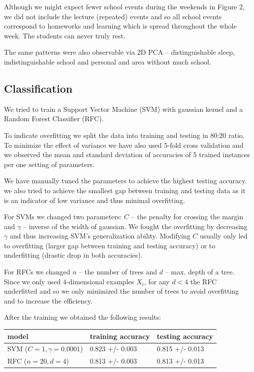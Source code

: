 \documentclass[a4paper, 12pt]{article}
\begin{document}
Although we might expect fewer school events during the weekends in Figure 2,
we did not include the lecture (repeated) events and so all school events correspond to
homeworks and learning which is spread throughout the whole week.
The students can never truly rest.

The same patterns were also observable via 2D PCA -- distinguishable sleep,
indistinguishable school and personal and area without much school.

\subsection{Classification}
We tried to train a Support Vector Machine (SVM) with gaussian kernel and 
a Random Forest Classifier (RFC). 

\medskip

To indicate overfitting we split the data into training and testing in 80:20
ratio. To minimize the effect of variance we have also used 5-fold 
cross validation and we observed the mean and standard deviation of accuracies
of 5 trained instances per one setting of parameters.

We have manually tuned the parameters to achieve the highest testing accuracy.
we also tried to achieve the smallest gap between training and testing
data as it is an indicator of low variance and thus minimal overfitting.

For SVMs we changed two parameters: $C$ -- the penalty for crossing the
margin and $\gamma$ -- inverse of the width of gaussian. We fought the
overfitting by decreasing $\gamma$ and thus increasing SVM's 
generalization ability. Modifying $C$ usually only led to overfitting (larger
gap between training and testing accuracy) or to underfitting (drastic drop
in both accuracies).

For RFCs we changed $n$ -- the number of trees and $d$ -- max. depth of a tree.
Since we only used 4-dimensional examples $X_i$, for any $d<4$ the RFC underfitted
and so we only minimized the number of trees to avoid overfitting and to increase
the efficiency.

\medskip 

After the training we obtained the following results:
\begin{table}[h!]
\centering
\begin{tabular}{ l l l }
model & training accuracy & testing accuracy \\  \hline 
SVM ($C=1, \gamma=0.0001$) & 0.823 +/- 0.003  & 0.815 +/- 0.013 \\
RFC ($n=20, d=4$) & 0.813 +/- 0.003 & 0.813 +/- 0.013    
\end{tabular}
\end{table}
\end{document}
